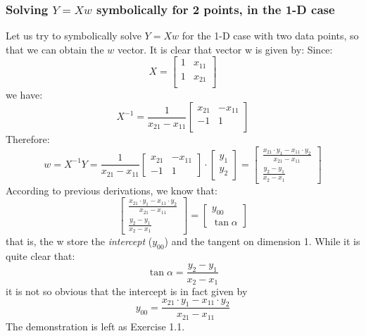 \subsubsection{Solving $Y = Xw$ symbolically for 2 points, in the 1-D case}
Let us try to symbolically solve $Y = Xw$ for the 1-D case with two data points, so that we can obtain the $w$ vector. It is clear that vector w is given by:
Since:
\begin{equation}
X =
\begin{bmatrix}
1 & x_{11}\\
1 & x_{21}\\
\end{bmatrix}
\end{equation}
we have:
\begin{equation}
X^{-1} = \frac{1}{x_{21}-x_{11}}
\begin{bmatrix}
x_{21} & -x_{11}\\
-1 & 1\\
\end{bmatrix}
\end{equation}
Therefore:
\begin{equation}
w = X^{-1} Y = \frac{1}{x_{21}-x_{11}}
\begin{bmatrix}
x_{21} & -x_{11}\\
-1 & 1
\end{bmatrix}
\cdot
\begin{bmatrix}
y_1 \\
y_2
\end{bmatrix}
=
\begin{bmatrix}
\frac{x_{21} \cdot y_1 - x_{11} \cdot y_2}{x_{21} - x_{11}}  \\
\frac{y_2 - y_1}{x_2 - x_1}
\end{bmatrix}
\end{equation}
According to previous derivations, we know that:
\begin{equation}
\begin{bmatrix}
\frac{x_{21} \cdot y_1 - x_{11} \cdot y_2}{x_{21} - x_{11}}  \\
\frac{y_2 - y_1}{x_2 - x_1}
\end{bmatrix}
=
\begin{bmatrix}
y_{00}\\
\tan \alpha
\end{bmatrix}
\end{equation}
that is, the w store the \emph{intercept} ($y_{00}$) and the tangent on dimension 1. While it is quite clear that:
\begin{equation}
\tan \alpha = \frac{y_2 - y_1}{x_2 - x_1} 
\end{equation}
it is not so obvious that the intercept is in fact given by
\begin{equation}
y_{00} = \frac{x_{21} \cdot y_1 - x_{11} \cdot y_2}{x_{21} - x_{11}}
\label{intercept_equation_symbolic_2d_derivation}
\end{equation}
The demonstration is left as Exercise 1.1.

